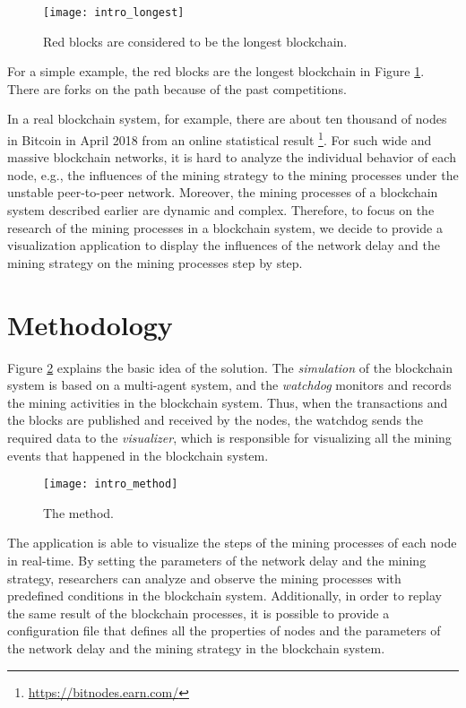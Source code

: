 \begin{figure}[htb]
    \centering
    \texttt{[image: intro\_longest]}
    \caption{Red blocks are considered to be the longest blockchain.}
    \label{fig:red blocks are considered to be the longest blockchain}
\end{figure}

For a simple example, the red blocks are the longest blockchain in Figure \ref{fig:red blocks are considered to be the longest blockchain}. There are forks on the path because of the past competitions.

In a real blockchain system, for example, there are about ten thousand of nodes in Bitcoin in April 2018 from an online statistical result \footnote{\url{https://bitnodes.earn.com/}}. For such wide and massive blockchain networks, it is hard to analyze the individual behavior of each node, e.g., the influences of the mining strategy to the mining processes under the unstable peer-to-peer network. Moreover, the mining processes of a blockchain system described earlier are dynamic and complex. Therefore, to focus on the research of the mining processes in a blockchain system, we decide to provide a visualization application to display the influences of the network delay and the mining strategy on the mining processes step by step.

\section{Methodology}

Figure \ref{fig:the method} explains the basic idea of the solution. The \textit{simulation} of the blockchain system is based on a multi-agent system, and the \textit{watchdog} monitors and records the mining activities in the blockchain system. Thus, when the transactions and the blocks are published and received by the nodes, the watchdog sends the required data to the \textit{visualizer}, which is responsible for visualizing all the mining events that happened in the blockchain system. 

\begin{figure}[htb]
    \centering
    \texttt{[image: intro\_method]}
    \caption{The method.}
    \label{fig:the method}
\end{figure}

The application is able to visualize the steps of the mining processes of each node in real-time. By setting the parameters of the network delay and the mining strategy, researchers can analyze and observe the mining processes with predefined conditions in the blockchain system. Additionally, in order to replay the same result of the blockchain processes, it is possible to provide a configuration file that defines all the properties of nodes and the parameters of the network delay and the mining strategy in the blockchain system.

